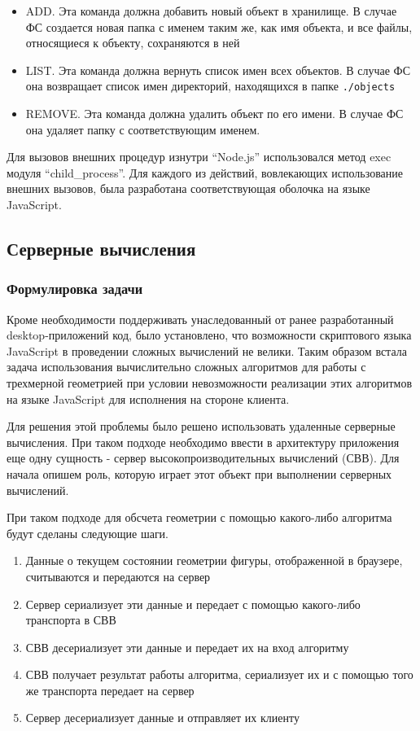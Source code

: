 \documentclass[14pt, a4paper]{extarticle}
\begin{document}
\begin{itemize}
    \item ADD. Эта команда должна добавить новый объект в хранилище. В
    случае ФС создается новая папка с именем таким же, как имя объекта, и все
    файлы, относящиеся к объекту, сохраняются в ней
    \item LIST. Эта команда должна вернуть список имен всех объектов. В
    случае ФС она возвращает список имен директорий, находящихся в папке
    \texttt{./objects}
    \item REMOVE. Эта команда должна удалить объект по его имени. В случае
    ФС она удаляет папку с соответствующим именем.
\end{itemize}

Для вызовов внешних процедур изнутри ``Node.js'' использовался метод exec модуля
``child\_process''. Для каждого из действий, вовлекающих использование внешних
вызовов, была разработана соответствующая оболочка на языке JavaScript.

\subsection{Серверные вычисления}

\subsubsection{Формулировка задачи}

Кроме необходимости поддерживать унаследованный от ранее разработанный
desktop-приложений код, было установлено, что возможности скриптового языка
JavaScript в проведении сложных вычислений не велики. Таким образом встала
задача использования вычислительно сложных алгоритмов для работы с трехмерной
геометрией при условии невозможности реализации этих алгоритмов на языке
JavaScript для исполнения на стороне клиента.

Для решения этой проблемы было решено использовать удаленные серверные
вычисления. При таком подходе необходимо ввести в архитектуру приложения еще
одну сущность - сервер высокопроизводительных вычислений (СВВ). Для начала
опишем роль, которую играет этот объект при выполнении серверных вычислений.

При таком подходе для обсчета геометрии с помощью какого-либо алгоритма будут
сделаны следующие шаги.

\begin{enumerate}
    \item Данные о текущем состоянии геометрии фигуры, отображенной в браузере,
    считываются и передаются на сервер
    \item Сервер сериализует эти данные и передает с помощью какого-либо
    транспорта в СВВ
    \item СВВ десериализует эти данные и передает их на вход алгоритму
    \item СВВ получает результат работы алгоритма, сериализует их и с
    помощью того же транспорта передает на сервер
    \item Сервер десериализует данные и отправляет их клиенту
\end{enumerate}
\end{document}
